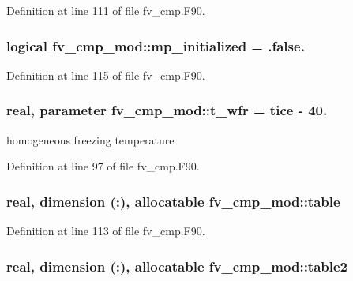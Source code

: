 Definition at line 111 of file fv\-\_\-cmp.\-F90.

\subsubsection[{mp\-\_\-initialized}]{\setlength{\rightskip}{0pt plus 5cm}logical fv\-\_\-cmp\-\_\-mod\-::mp\-\_\-initialized = .false.\hspace{0.3cm}{\ttfamily [private]}}\label{classfv__cmp__mod_af9c43700533ec209e98ed9aaea7220ad}


Definition at line 115 of file fv\-\_\-cmp.\-F90.

\subsubsection[{t\-\_\-wfr}]{\setlength{\rightskip}{0pt plus 5cm}real, parameter fv\-\_\-cmp\-\_\-mod\-::t\-\_\-wfr = {\bf tice} -\/ 40.\hspace{0.3cm}{\ttfamily [private]}}\label{classfv__cmp__mod_a4fe62a9a87a3aa5466fa0afe5ceb070a}


homogeneous freezing temperature 



Definition at line 97 of file fv\-\_\-cmp.\-F90.

\subsubsection[{table}]{\setlength{\rightskip}{0pt plus 5cm}real, dimension (\-:), allocatable fv\-\_\-cmp\-\_\-mod\-::table\hspace{0.3cm}{\ttfamily [private]}}\label{classfv__cmp__mod_a7a34f8d4c0eefd0e66de45d280bb0ba4}


Definition at line 113 of file fv\-\_\-cmp.\-F90.

\subsubsection[{table2}]{\setlength{\rightskip}{0pt plus 5cm}real, dimension (\-:), allocatable fv\-\_\-cmp\-\_\-mod\-::table2\hspace{0.3cm}{\ttfamily [private]}}\label{classfv__cmp__mod_a16427443f0f4cc4376e7a7af841cc03d}


